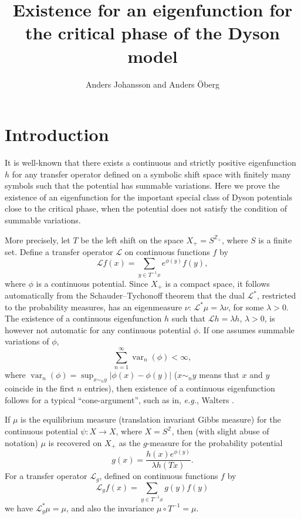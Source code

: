 \documentclass[11pt, a4paper, oneside]{article}
\title{Existence for an eigenfunction for the critical phase of the Dyson model}
\author{Anders Johansson and Anders \"Oberg}
\date{}
\theoremstyle{definition}
\theoremstyle{remark}
\providecommand{\opn}{\operatorname}
\providecommand{\var}{\opn{var}}
\begin{document}
\maketitle


\section{Introduction}\noindent
It is well-known that there exists a continuous and strictly positive
eigenfunction $h$ for any transfer operator defined on a symbolic shift space
with finitely many symbols such that the potential has summable variations. Here
we prove the existence of an eigenfunction for the important special class of
Dyson potentials close to the critical phase, when the potential does not
satisfy the condition of summable variations.

\def\h{h}

More precisely, let $T$ be the left shift on the space $X_+=S^{{\mathbb Z}_+}$,
where $S$ is a finite set. Define a transfer operator ${\mathcal L}$ on
continuous functions $f$ by
\begin{equation}\label{trans} {\mathcal L} f(x)= \sum_{y\in T^{-1}x}
  e^{\phi(y)}f(y),
\end{equation}
where $\phi$ is a continuous potential. Since $X_+$ is a compact space, it
follows automatically from the Schauder--Tychonoff theorem that the dual
${\mathcal L}^*$, restricted to the probability measures, has an eigenmeasure
$\nu$: ${\mathcal L}^* \mu=\lambda \nu$, for some $\lambda>0$. The existence of
a continuous eigenfunction $h$ such that ${\mathcal L}h=\lambda h$, $\lambda>0$,
is however not automatic for any continuous potential $\phi$. If one assumes
summable variations of $\phi$,
\begin{equation}\label{sum}
  \sum_{n=1}^\infty \var_n (\phi)<\infty,
\end{equation}
where $\var_n(\phi)=\sup_{x\sim_n y}|\phi(x)-\phi(y)|$ ($x\sim_n y$ means that
$x$ and $y$ coincide in the first $n$ entries), then existence of a continuous
eigenfunction follows for a typical ``cone-argument'', such as in, {\em e.g.},
Walters \cite{walters1}.

If $\mu$ is the equilibrium measure (translation invariant Gibbs measure) for
the continuous potential $\psi:X\to X$, where $X=S^{\mathbb Z}$, then (with
slight abuse of notation) $\mu$ is recovered on $X_+$ as the $g$-measure for the
probability potential
\begin{equation}\label{g}
  g(x)= \frac{h(x) e^{\phi(y)}}{\lambda h(Tx)}.
\end{equation} 
For a transfer operator ${\mathcal L}_g$, defined on continuous functions $f$ by
\begin{equation} {\mathcal L}_g f(x)=\sum_{y\in T^{-1}x} g(y) f(y)
\end{equation}
we have ${\mathcal L}_g^*\mu=\mu$, and also the invariance $\mu\circ
T^{-1}=\mu$.
\end{document}
